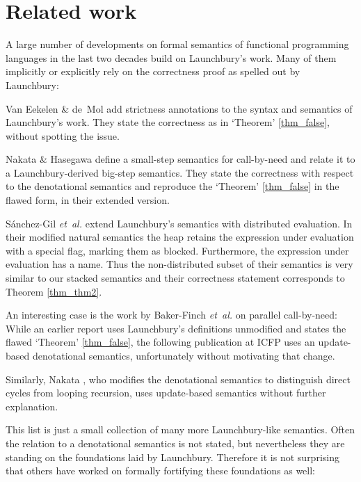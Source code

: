 \documentclass{jfp1}
\theoremstyle{nonumberbreak}
\begin{document}
\section{Related work}

A large number of developments on formal semantics of functional programming languages in the last two decades build on Launchbury’s work. Many of them implicitly or explicitly rely on the correctness proof as spelled out by Launchbury:

Van Eekelen \& de~Mol  add strictness annotations to the syntax and semantics of Launchbury’s work. They state the correctness as in `Theorem' \ref{thm_false}, without spotting the issue.


Nakata \& Hasegawa  define a small-step semantics for call-by-need and relate it to a Launchbury-derived big-step semantics. They state the correctness with respect to the denotational semantics and reproduce the `Theorem' \ref{thm_false} in the flawed form, in their extended version.

S{\'a}nchez-Gil {\em et~al.}  extend Launchbury's semantics with distributed evaluation.  In their modified natural semantics the heap retains the expression under evaluation with a special flag, marking them as blocked. Furthermore, the expression under evaluation has a name. Thus the non-distributed subset of their semantics is very similar to our stacked semantics and their correctness statement corresponds to Theorem \ref{thm_thm2}.

An interesting case is the work by Baker-Finch {\em et~al.} on parallel call-by-need: While an earlier report  uses Launchbury’s definitions unmodified and states the flawed `Theorem' \ref{thm_false}, the following publication at ICFP  uses an update-based denotational semantics, unfortunately without motivating that change.

Similarly, Nakata  , who modifies the denotational semantics to distinguish direct cycles from looping recursion, uses update-based semantics without further explanation. 

This list is just a small collection of many more Launchbury-like semantics. Often the relation to a denotational semantics is not stated, but nevertheless they are standing on the foundations laid by Launchbury. Therefore it is not surprising that others have worked on formally fortifying these foundations as well:
\end{document}

